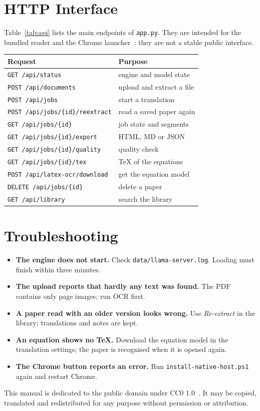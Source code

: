 \documentclass[11pt]{article}
\let\manualtable\table \let\endmanualtable\endtable
\renewenvironment{table}[1][]{\manualtable[!htbp]}{\endmanualtable}
\begin{document}
\appendix
\section{HTTP Interface}
\label{app:api}
Table~\ref{tab:api} lists the main endpoints of \texttt{app.py}. They are intended for the bundled reader and the Chrome launcher~\cite{nativemessaging}; they are not a stable public interface.

\begin{table}[ht]
  \centering
  \caption{Main HTTP endpoints.}
  \label{tab:api}
  \small
  \begin{tabular}{@{}ll@{}}
    \toprule
    Request & Purpose \\
    \midrule
    \texttt{GET /api/status} & engine and model state \\
    \texttt{POST /api/documents} & upload and extract a file \\
    \texttt{POST /api/jobs} & start a translation \\
    \texttt{POST /api/jobs/\{id\}/reextract} & read a saved paper again \\
    \texttt{GET /api/jobs/\{id\}} & job state and segments \\
    \texttt{GET /api/jobs/\{id\}/export} & HTML, MD or JSON \\
    \texttt{GET /api/jobs/\{id\}/quality} & quality check \\
    \texttt{GET /api/jobs/\{id\}/tex} & \TeX{} of the equations \\
    \texttt{POST /api/latex-ocr/download} & get the equation model \\
    \texttt{DELETE /api/jobs/\{id\}} & delete a paper \\
    \texttt{GET /api/library} & search the library \\
    \bottomrule
  \end{tabular}
\end{table}

\section{Troubleshooting}
\label{app:trouble}
\begin{itemize}
  \item \textbf{The engine does not start.} Check \texttt{data/llama-server.log}. Loading must finish within three minutes.
  \item \textbf{The upload reports that hardly any text was found.} The PDF contains only page images; run OCR first.
  \item \textbf{A paper read with an older version looks wrong.} Use \emph{Re-extract} in the library; translations and notes are kept.
  \item \textbf{An equation shows no \TeX.} Download the equation model in the translation settings; the paper is recognised when it is opened again.
  \item \textbf{The Chrome button reports an error.} Run \texttt{install-native-host.ps1} again and restart Chrome.
\end{itemize}

\vspace{6pt}
\noindent\small This manual is dedicated to the public domain under CC0 1.0~\cite{cc0}. It may be copied, translated and redistributed for any purpose without permission or attribution.
\end{document}
